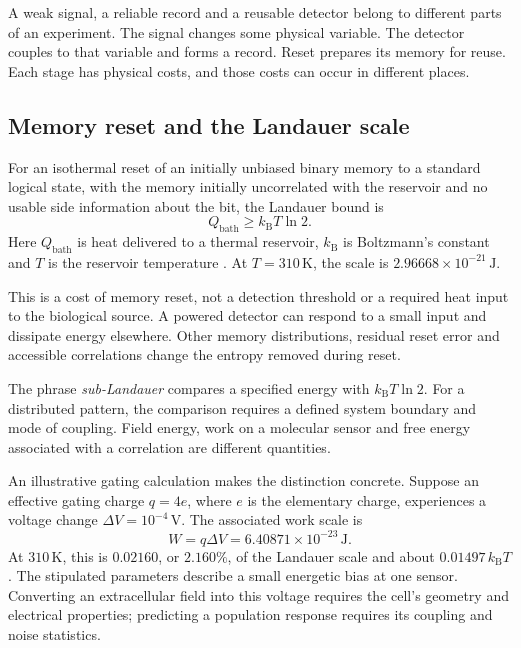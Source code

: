 \documentclass[10pt,twocolumn]{article}
\begin{document}
A weak signal, a reliable record and a reusable detector belong to different parts of an experiment. The signal changes some physical variable. The detector couples to that variable and forms a record. Reset prepares its memory for reuse. Each stage has physical costs, and those costs can occur in different places.

\subsection{Memory reset and the Landauer scale}

For an isothermal reset of an initially unbiased binary memory to a standard logical state, with the memory initially uncorrelated with the reservoir and no usable side information about the bit, the Landauer bound is
\begin{equation}
Q_{\mathrm{bath}}\geq k_{\mathrm B}T\ln 2.
\label{eq:landauer}
\end{equation}
Here \(Q_{\mathrm{bath}}\) is heat delivered to a thermal reservoir, \(k_{\mathrm B}\) is Boltzmann's constant and \(T\) is the reservoir temperature \citep{landauer1961}. At \(T=310\,\mathrm K\), the scale is \(2.96668\times10^{-21}\,\mathrm J\).

This is a cost of memory reset, not a detection threshold or a required heat input to the biological source. A powered detector can respond to a small input and dissipate energy elsewhere. Other memory distributions, residual reset error and accessible correlations change the entropy removed during reset.

The phrase \emph{sub-Landauer} compares a specified energy with \(k_{\mathrm B}T\ln2\). For a distributed pattern, the comparison requires a defined system boundary and mode of coupling. Field energy, work on a molecular sensor and free energy associated with a correlation are different quantities.

An illustrative gating calculation makes the distinction concrete. Suppose an effective gating charge \(q=4e\), where \(e\) is the elementary charge, experiences a voltage change \(\Delta V=10^{-4}\,\mathrm V\). The associated work scale is
\begin{equation}
W=q\Delta V=6.40871\times10^{-23}\,\mathrm J.
\label{eq:gating}
\end{equation}
At \(310\,\mathrm K\), this is \(0.02160\), or \(2.160\%\), of the Landauer scale and about \(0.01497\,k_{\mathrm B}T\). The stipulated parameters describe a small energetic bias at one sensor. Converting an extracellular field into this voltage requires the cell's geometry and electrical properties; predicting a population response requires its coupling and noise statistics.
\end{document}
